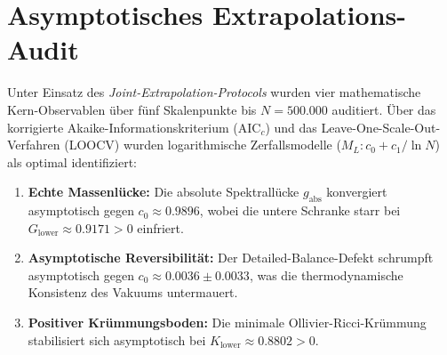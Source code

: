 \documentclass[11pt,a4paper]{article}
\begin{document}
	\section{Asymptotisches Extrapolations-Audit}
	Unter Einsatz des \textit{Joint-Extrapolation-Protocols} wurden vier mathematische Kern-Observablen über fünf Skalenpunkte bis $N = 500.000$ auditiert. Über das korrigierte Akaike-Informationskriterium ($\text{AIC}_c$) und das Leave-One-Scale-Out-Verfahren (LOOCV) wurden logarithmische Zerfallsmodelle ($M_L: c_0 + c_1/\ln N$) als optimal identifiziert:
	\begin{enumerate}
		\item \textbf{Echte Massenlücke:} Die absolute Spektrallücke $g_{\text{abs}}$ konvergiert asymptotisch gegen $c_0 \approx 0.9896$, wobei die untere Schranke starr bei $G_{\text{lower}} \approx 0.9171 > 0$ einfriert.
		\item \textbf{Asymptotische Reversibilität:} Der Detailed-Balance-Defekt schrumpft asymptotisch gegen $c_0 \approx 0.0036 \pm 0.0033$, was die thermodynamische Konsistenz des Vakuums untermauert.
		\item \textbf{Positiver Krümmungsboden:} Die minimale Ollivier-Ricci-Krümmung stabilisiert sich asymptotisch bei $K_{\text{lower}} \approx 0.8802 > 0$.
	\end{enumerate}
	
\end{document}
